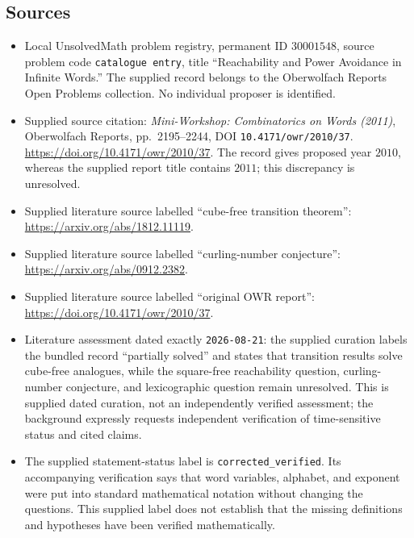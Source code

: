 \documentclass[11pt]{article}
\begin{document}
\subsection{Sources}
\begin{itemize}
\item Local UnsolvedMath problem registry, permanent ID $30001548$, source problem code \texttt{catalogue entry}, title ``Reachability and Power Avoidance in Infinite Words.'' The supplied record belongs to the Oberwolfach Reports Open Problems collection. No individual proposer is identified.
\item Supplied source citation: \emph{Mini-Workshop: Combinatorics on Words (2011)}, Oberwolfach Reports, pp.\ 2195--2244, DOI \texttt{10.4171/owr/2010/37}. \url{https://doi.org/10.4171/owr/2010/37}. The record gives proposed year $2010$, whereas the supplied report title contains $2011$; this discrepancy is unresolved.
\item Supplied literature source labelled ``cube-free transition theorem'': \url{https://arxiv.org/abs/1812.11119}.
\item Supplied literature source labelled ``curling-number conjecture'': \url{https://arxiv.org/abs/0912.2382}.
\item Supplied literature source labelled ``original OWR report'': \url{https://doi.org/10.4171/owr/2010/37}.
\item Literature assessment dated exactly \texttt{2026-08-21}: the supplied curation labels the bundled record ``partially solved'' and states that transition results solve cube-free analogues, while the square-free reachability question, curling-number conjecture, and lexicographic question remain unresolved. This is supplied dated curation, not an independently verified assessment; the background expressly requests independent verification of time-sensitive status and cited claims.
\item The supplied statement-status label is \texttt{corrected\_verified}. Its accompanying verification says that word variables, alphabet, and exponent were put into standard mathematical notation without changing the questions. This supplied label does not establish that the missing definitions and hypotheses have been verified mathematically.
\end{itemize}
\end{document}
